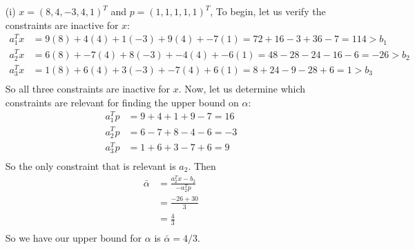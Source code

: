 \documentclass{article}
\begin{document}
    \begin{itemize}
        \item[(i)] $x = (8,4,-3,4,1)^T$ and $p = (1,1,1,1,1)^T$,
        \newline\newline
        To begin, let us verify the constraints are inactive for $x$:
        \begin{align*}
            a_1^Tx &= 9(8) + 4(4) + 1(-3) + 9(4) + -7(1) = 72 + 16 - 3 + 36 - 7 = 114 > b_1\\
            a_2^Tx &= 6(8) + -7(4) + 8(-3) + -4(4) + -6(1) = 48 - 28 - 24 - 16 - 6 = -26 > b_2\\
            a_3^Tx &= 1(8) + 6(4) + 3(-3) + -7(4) + 6(1) = 8 + 24 - 9 - 28 + 6 = 1 > b_3\\
        \end{align*}
        So all three constraints are inactive for $x$. Now, let us determine which constraints are relevant for finding the upper bound on $\alpha$:
        \begin{align*}
            a_1^Tp &= 9 + 4 + 1 + 9 - 7 = 16\\
            a_2^Tp &= 6 - 7 + 8 - 4 - 6 = -3\\
            a_3^Tp &= 1 + 6 + 3 - 7 + 6 = 9\\
        \end{align*}
        So the only constraint that is relevant is $a_2$. Then
        \begin{align*}
            \bar{\alpha} &= \frac{a_2^Tx - b_2}{-a_2^Tp} \\
            &= \frac{-26 + 30}{3} \\
            &= \frac{4}{3} \\
        \end{align*}
        So we have our upper bound for $\alpha$ is $\bar{\alpha} = 4/3$.
        


\end{itemize}
\end{document}
